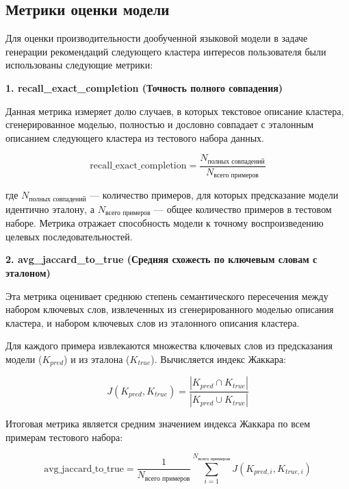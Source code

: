 \subsection*{Метрики оценки модели}

Для оценки производительности дообученной языковой модели в задаче генерации рекомендаций следующего кластера интересов пользователя были использованы следующие метрики:

\textbf{1. recall\_exact\_completion (Точность полного совпадения)}

Данная метрика измеряет долю случаев, в которых текстовое описание кластера, сгенерированное моделью, полностью и дословно совпадает с эталонным описанием следующего кластера из тестового набора данных.

\begin{equation}
\text{recall\_exact\_completion} = \frac{N_{\text{полных совпадений}}}{N_{\text{всего примеров}}}
\end{equation}

где $N_{\text{полных совпадений}}$ — количество примеров, для которых предсказание модели идентично эталону, а $N_{\text{всего примеров}}$ — общее количество примеров в тестовом наборе. Метрика отражает способность модели к точному воспроизведению целевых последовательностей.

\textbf{2. avg\_jaccard\_to\_true (Средняя схожесть по ключевым словам с эталоном)}

Эта метрика оценивает среднюю степень семантического пересечения между набором ключевых слов, извлеченных из сгенерированного моделью описания кластера, и набором ключевых слов из эталонного описания кластера.

Для каждого примера извлекаются множества ключевых слов из предсказания модели ($K_{pred}$) и из эталона ($K_{true}$). Вычисляется индекс Жаккара:

\begin{equation}
J(K_{pred}, K_{true}) = \frac{|K_{pred} \cap K_{true}|}{|K_{pred} \cup K_{true}|}
\end{equation}

Итоговая метрика является средним значением индекса Жаккара по всем примерам тестового набора:

\begin{equation}
\text{avg\_jaccard\_to\_true} = \frac{1}{N_{\text{всего примеров}}} \sum_{i=1}^{N_{\text{всего примеров}}} J(K_{pred, i}, K_{true, i})
\end{equation}

